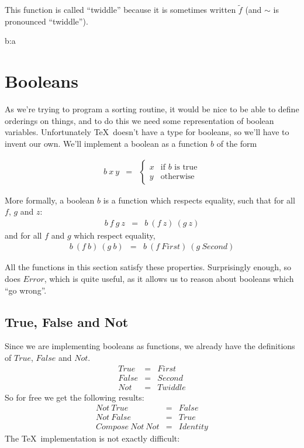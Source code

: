 This function is called ``twiddle'' because it is sometimes written
$\widetilde f$ (and $\sim$ is pronounced ``twiddle'').  

\def\foo#1#2{#1:#2}

\def\Twiddle#1#2#3{#1{#3}{#2}}
\Twiddle\foo{a}{b}


\section{Booleans}

As we're trying to program a sorting routine, it would be nice to
be able to define orderings on things, and to do this we need some
representation of boolean variables.  Unfortunately \TeX\ doesn't have a type
for booleans, so we'll have to invent our own.  We'll
implement a boolean as a function $b$ of the form

\begin{eqnarray*}
   b~x~y  &  
   =  &  
   \left\{
      \begin{array}{ll}
         x  &  \mbox{if $b$ is true}  \\
         y  &  \mbox{otherwise}
      \end{array}
   \right.
\end{eqnarray*}

More formally, a 
boolean $b$ is a function which respects equality,
such that for all $f$, $g$ and $z$:
\begin{eqnarray*}
   b~f~g~z  &  =  &  b~(f~z)~(g~z)
\end{eqnarray*}
and for all $f$ and $g$ which respect equality,
\begin{eqnarray*}
   b~(f~b)~(g~b)  &  =  &  b~(f~First)~(g~Second)
\end{eqnarray*}

All the functions in this section satisfy these properties.  Surprisingly
enough, so does $Error$, which is quite useful, as it allows us to 
reason about booleans which ``go wrong''.  

\subsection{True, False and Not}

Since we are implementing booleans as functions, we already have the
definitions of $True$, $False$ and $Not$.
\begin{eqnarray*}
    True  &  =  &  First  \\
   False  &  =  &  Second  \\
     Not  &  =  &  Twiddle
\end{eqnarray*}
So for free we get the following results:
\begin{eqnarray*}
          Not~True  &  =  &  False  \\
         Not~False  &  =  &  True  \\
   Compose~Not~Not  &  =  &  Identity  
\end{eqnarray*}
The \TeX\ implementation is not exactly difficult:

